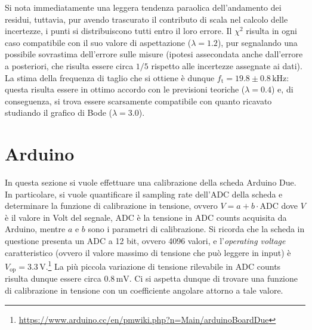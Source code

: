 \documentclass[a4paper,11pt]{article} %
\begin{document}
\noindent Si nota immediatamente una leggera tendenza paraolica dell'andamento dei residui, tuttavia, pur avendo
trascurato il contributo di scala nel calcolo delle incertezze, i punti si distribuiscono tutti entro il loro errore. Il
$\chi^2$ risulta in ogni caso compatibile con il suo valore di aspettazione ($\lambda = 1.2$), pur segnalando una
possibile sovrastima dell'errore sulle misure (ipotesi assecondata anche dall'errore a posteriori, che risulta essere
circa $1/5$ rispetto alle incertezze assegnate ai dati). La stima della frequenza di taglio che si ottiene è dunque
$f_{\text{t}} = 19.8\pm 0.8\,\si{\kHz}$: questa risulta essere in ottimo accordo con le previsioni teoriche
($\lambda=0.4$) e, di conseguenza, si trova essere scarsamente compatibile con quanto ricavato studiando il grafico di
Bode ($\lambda = 3.0$).



\section{Arduino}
In questa sezione si vuole effettuare una calibrazione della scheda Arduino Due. In particolare, si vuole quantificare
il sampling rate dell'ADC della scheda e determinare la funzione di calibrazione in tensione, ovvero $V = a + b \cdot
\text{ADC}$ dove $V$ è il valore in Volt del segnale, $\text{ADC}$ è la tensione in ADC counts acquisita da Arduino,
mentre $a$ e $b$ sono i parametri di calibrazione. Si ricorda che la scheda in questione presenta un ADC a 12 bit,
ovvero 4096 valori, e l'\textit{operating voltage} caratteristico (ovvero il valore massimo di tensione che può leggere
in input) è $V_{\text{op}}=3.3\,\si{\volt}$.\footnote{\url{https://www.arduino.cc/en/pmwiki.php?n=Main/arduinoBoardDue}}
La più piccola variazione di tensione rilevabile in ADC counts risulta dunque essere circa $0.8\,\si{\mV}$. Ci si
aspetta dunque di trovare una funzione di calibrazione in tensione con un coefficiente angolare attorno a tale valore. 

\end{document}
